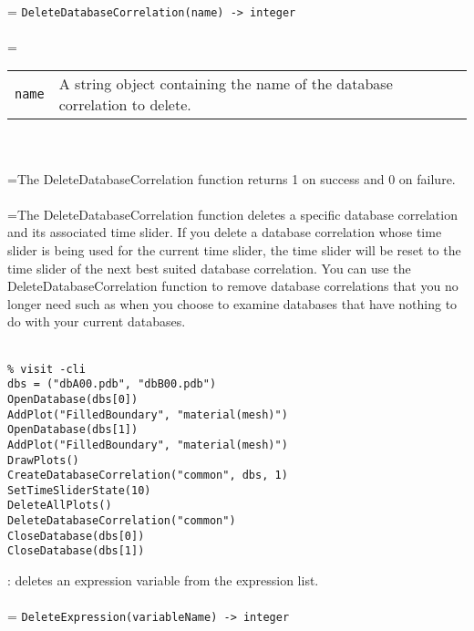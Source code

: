 \documentclass[10pt,a4paper]{report}
\begin{document}
 \\ 
\hangindent=\parindent 
\verb!DeleteDatabaseCorrelation(name) -> integer!\\ [-3mm]

 \\ 
\hangindent=\parindent 
\begin{tabular}{lp{9cm}}
\verb!name! & A string object containing the name of the database correlation to delete. \\
\end{tabular} \\[-2mm]


 \\ 
\hangindent=\parindent The DeleteDatabaseCorrelation function returns 1 on success and 0 on failure. \\[-3mm] 

 \\ 
\hangindent=\parindent The DeleteDatabaseCorrelation function deletes a specific database correlation and its associated time slider. If you delete a database correlation whose time slider is being used for the current time slider, the time slider will be reset to the time slider of the next best suited database correlation. You can use the DeleteDatabaseCorrelation function to remove database correlations that you no longer need such as when you choose to examine databases that have nothing to do with your current databases. \\[-3mm] 

\\[-6mm]
\begin{verbatim}% visit -cli
dbs = ("dbA00.pdb", "dbB00.pdb")
OpenDatabase(dbs[0])
AddPlot("FilledBoundary", "material(mesh)")
OpenDatabase(dbs[1])
AddPlot("FilledBoundary", "material(mesh)")
DrawPlots()
CreateDatabaseCorrelation("common", dbs, 1)
SetTimeSliderState(10)
DeleteAllPlots()
DeleteDatabaseCorrelation("common")
CloseDatabase(dbs[0])
CloseDatabase(dbs[1])
\end{verbatim}
\newpage


{}
: deletes an expression variable from the expression list.\\[-3mm]

 \\ 
\hangindent=\parindent 
\verb!DeleteExpression(variableName) -> integer!\\ [-3mm]
\end{document}
